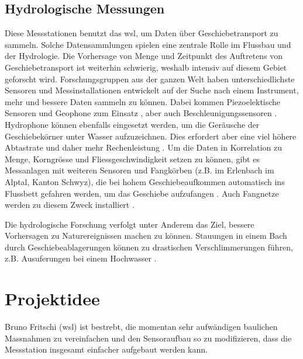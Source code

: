 \subsection{Hydrologische Messungen}
Diese Messstationen benutzt das \gls{wsl}, um Daten über Geschiebetransport zu sammeln. Solche Datensammlungen spielen eine zentrale Rolle im Flussbau und der \gls{Hydrologie}. Die Vorhersage von Menge und Zeitpunkt des Auftretens von Geschiebetransport ist weiterhin schwierig, weshalb intensiv auf diesem Gebiet geforscht wird. Forschungsgruppen aus der ganzen Welt haben unterschiedlichste Sensoren und Messinstallationen entwickelt auf der Suche nach einem Instrument, mehr und bessere Daten sammeln zu können. Dabei kommen Piezoelektische Sensoren und Geophone zum Einsatz \cite{rickenmann2012ESPL}, aber auch Beschleunigungssensoren \cite{reid2007}. Hydrophone können ebenfalls eingesetzt werden, um die Geräusche der Geschiebekörner unter Wasser aufzuzeichnen. Dies erfordert aber eine viel höhere Abtastrate und daher mehr Rechenleistung \cite{wyss2014}. Um die Daten in Korrelation zu Menge, Korngrösse und Fliessgeschwindigkeit setzen zu können, gibt es Messanlagen mit weiteren Sensoren und Fangkörben (z.B. im Erlenbach im Alptal, Kanton Schwyz), die bei hohem Geschiebeaufkommen automatisch ins Flussbett gefahren werden, um das Geschiebe aufzufangen \cite{rickenmann2014ESPL}. Auch Fangnetze werden zu diesem Zweck installiert \cite{rickenmann2014ESPL}. 

Die hydrologische Forschung verfolgt unter Anderem das Ziel, bessere Vorhersagen zu Naturereignissen machen zu können. Stauungen in einem Bach durch Geschiebeablagerungen können zu drastischen Verschlimmerungen führen, z.B. Ausuferungen bei einem Hochwasser \cite{turowski2008}.

\section{Projektidee}
Bruno Fritschi (\gls{wsl}) ist bestrebt, die momentan sehr aufwändigen baulichen Massnahmen zu vereinfachen und den Sensoraufbau so zu modifizieren, dass die Messstation insgesamt einfacher aufgebaut werden kann.

